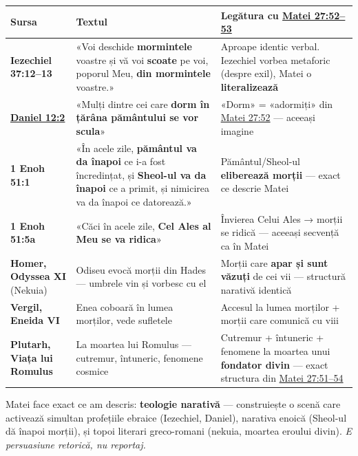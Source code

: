 \documentclass[12pt,a4paper,twoside,openany]{book}
\begin{document}
\begin{center}
\small
\begin{tabular}{L{1.5cm}L{7.9cm}L{5.5cm}}
\toprule
{}
\textbf{Sursa} & \textbf{Textul} & \textbf{Legătura cu \href{https://bibliaortodoxa.ro/carte.php?id=55\&cap=27\#52}{Matei 27:52–53}} \\
\midrule
\textbf{Iezechiel 37:12–13} & «Voi deschide \textbf{mormintele} voastre și vă voi \textbf{scoate} pe voi, poporul Meu, \textbf{din mormintele} voastre.» & Aproape identic verbal. Iezechiel vorbea metaforic (despre exil), Matei o \textbf{literalizează} \\
\textbf{\href{https://bibliaortodoxa.ro/carte.php?id=16\&cap=12\#2}{Daniel 12:2}} & «Mulți dintre cei care \textbf{dorm în țărâna pământului se vor scula}» & «Dorm» = «adormiți» din \href{https://bibliaortodoxa.ro/carte.php?id=55\&cap=27\#52}{Matei 27:52} — aceeași imagine \\
\textbf{1 Enoh 51:1} & «În acele zile, \textbf{pământul va da înapoi} ce i-a fost încredințat, și \textbf{Sheol-ul va da înapoi} ce a primit, și nimicirea va da înapoi ce datorează.» & Pământul/Sheol-ul \textbf{eliberează morții} — exact ce descrie Matei \\
\textbf{1 Enoh 51:5a} & «Căci în acele zile, \textbf{Cel Ales al Meu se va ridica}» & Învierea Celui Ales → morții se ridică — aceeași secvență ca în Matei \\
\textbf{Homer, Odyssea XI} (Nekuia) & Odiseu evocă morții din Hades — umbrele vin și vorbesc cu el & Morții care \textbf{apar și sunt văzuți} de cei vii — structură narativă identică \\
\textbf{Vergil, Eneida VI} & Enea coboară în lumea morților, vede sufletele & Accesul la lumea morților + morții care comunică cu viii \\
\textbf{Plutarh, Viața lui Romulus} & La moartea lui Romulus — cutremur, întuneric, fenomene cosmice & Cutremur + întuneric + fenomene la moartea unui \textbf{fondator divin} — exact structura din \href{https://bibliaortodoxa.ro/carte.php?id=55\&cap=27\#51}{Matei 27:51–54} \\
\bottomrule
\end{tabular}
\end{center}
\normalsize
Matei face exact ce am descris: \textbf{teologie narativă} — construiește o scenă care activează simultan profețiile ebraice (Iezechiel, Daniel), narativa enoică (Sheol-ul dă înapoi morții), și topoi literari greco-romani (nekuia, moartea eroului divin). \textit{E persuasiune retorică, nu reportaj.}
\end{document}

